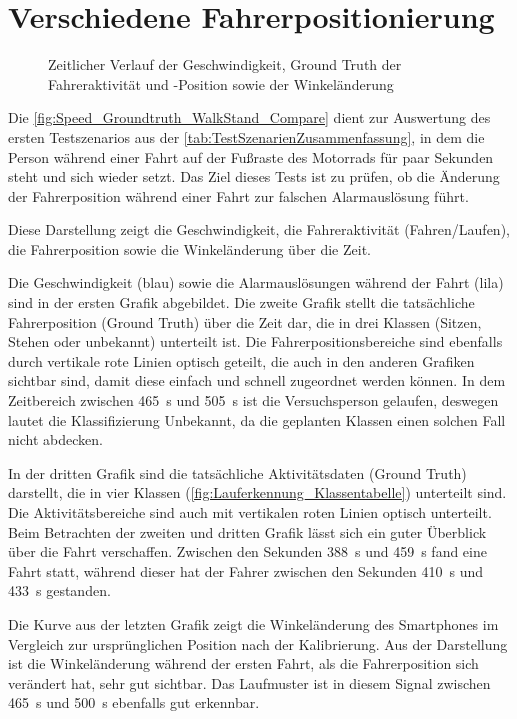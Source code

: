 \section{Verschiedene Fahrerpositionierung}
\begin{figure}[htpb]
	\centering
	\caption{Zeitlicher Verlauf der Geschwindigkeit, Ground Truth der Fahreraktivität und -Position sowie der Winkeländerung}
	\label{fig:Speed_Groundtruth_WalkStand_Compare}
\end{figure}
Die \autoref{fig:Speed_Groundtruth_WalkStand_Compare} dient zur Auswertung des ersten Testszenarios aus der \autoref{tab:TestSzenarienZusammenfassung}, in dem die Person während einer Fahrt auf der Fußraste des Motorrads für paar Sekunden steht und sich wieder setzt. Das Ziel dieses Tests ist zu prüfen, ob die Änderung der Fahrerposition während einer Fahrt zur falschen Alarmauslösung führt.

Diese Darstellung zeigt die Geschwindigkeit, die Fahreraktivität (Fahren/Laufen), die Fahrerposition sowie die Winkeländerung über die Zeit.

Die Geschwindigkeit (blau) sowie die Alarmauslösungen während der Fahrt (lila) sind in der ersten Grafik abgebildet.
Die zweite Grafik stellt die tatsächliche Fahrerposition (Ground Truth) über die Zeit dar, die in drei Klassen (Sitzen, Stehen oder unbekannt) unterteilt ist.
Die Fahrerpositionsbereiche sind ebenfalls durch vertikale rote Linien optisch geteilt, die auch in den anderen Grafiken sichtbar sind, damit diese einfach und schnell zugeordnet werden können.
In dem Zeitbereich zwischen \SI{465}{\second} und \SI{505}{\second} ist die Versuchsperson gelaufen, deswegen lautet die Klassifizierung \glqq Unbekannt\grqq{}, da die geplanten Klassen einen solchen Fall nicht abdecken.

In der dritten Grafik sind die tatsächliche Aktivitätsdaten (Ground Truth) darstellt, die in vier Klassen (\autoref{fig:Lauferkennung_Klassentabelle}) unterteilt sind. Die Aktivitätsbereiche sind auch mit vertikalen roten Linien optisch unterteilt. Beim Betrachten der zweiten und dritten Grafik lässt sich ein guter Überblick über die Fahrt verschaffen. Zwischen den Sekunden \SI{388}{\second} und \SI{459}{\second} fand eine Fahrt statt, während dieser hat der Fahrer zwischen den Sekunden \SI{410}{\second} und \SI{433}{\second} gestanden.

Die Kurve aus der letzten Grafik zeigt die Winkeländerung des Smartphones im Vergleich zur ursprünglichen Position nach der Kalibrierung. Aus der Darstellung ist die Winkeländerung während der ersten Fahrt, als die Fahrerposition sich verändert hat, sehr gut sichtbar. Das Laufmuster ist in diesem Signal zwischen \SI{465}{\second} und \SI{500}{\second} ebenfalls gut erkennbar.


